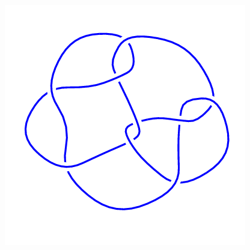 \begin{figure}[H]
\begin{minipage}[b]{.18\linewidth}
	\end{minipage}
	\begin{minipage}[b]{.18\linewidth}
		\centering
		\includegraphics[width=\linewidth]{../data/9_25.png}
	\end{minipage}
\end{figure}
